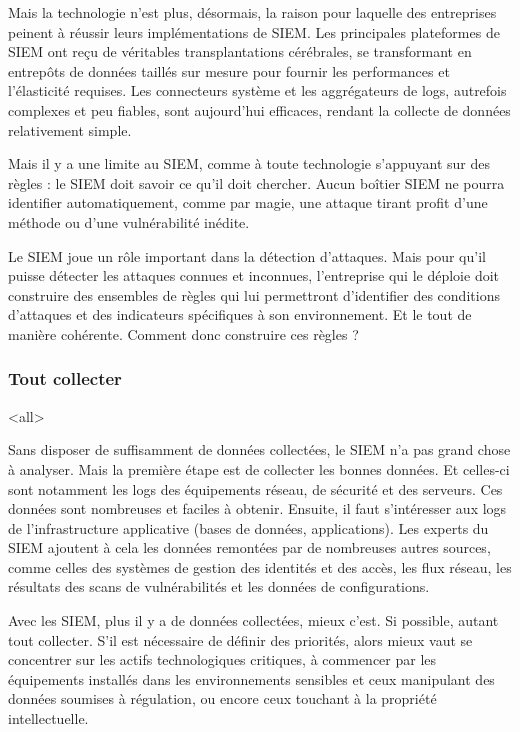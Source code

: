 Mais la technologie n’est plus, désormais, la raison pour laquelle des entreprises peinent à réussir leurs implémentations de SIEM. Les principales plateformes de SIEM ont reçu de véritables transplantations cérébrales, se transformant en entrepôts de données taillés sur mesure pour fournir les performances et l’élasticité requises. Les connecteurs système et les aggrégateurs de logs, autrefois complexes et peu fiables, sont aujourd’hui efficaces, rendant la collecte de données relativement simple.

Mais il y a une limite au SIEM, comme à toute technologie s’appuyant sur des règles : le SIEM doit savoir ce qu’il doit chercher. Aucun boîtier SIEM ne pourra identifier automatiquement, comme par magie, une attaque tirant profit d’une méthode ou d’une vulnérabilité inédite.

Le SIEM joue un rôle important dans la détection d’attaques. Mais pour qu’il puisse détecter les attaques connues et inconnues, l’entreprise qui le déploie doit construire des ensembles de règles qui lui permettront d’identifier des conditions d’attaques et des indicateurs spécifiques à son environnement. Et le tout de manière cohérente. Comment donc construire ces règles ?


\subsubsection{Tout collecter}



\mode<all>{}



Sans disposer de suffisamment de données collectées, le SIEM n’a pas grand chose à analyser. Mais la première étape est de collecter les bonnes données. Et celles-ci sont notamment les logs des équipements réseau, de sécurité  et des serveurs. Ces données sont nombreuses et faciles à obtenir. Ensuite, il faut s’intéresser aux logs de l’infrastructure applicative (bases de données, applications). Les experts du SIEM ajoutent à cela les données remontées par de nombreuses autres sources, comme celles des systèmes de gestion des identités et des accès, les flux réseau, les résultats des scans de vulnérabilités et les données de configurations.

Avec les SIEM, plus il y a de données collectées, mieux c’est. Si possible, autant tout collecter. S’il est nécessaire de définir des priorités, alors mieux vaut se concentrer sur les actifs technologiques critiques, à commencer par les équipements installés dans les environnements sensibles et ceux manipulant des données soumises à régulation, ou encore ceux touchant à la propriété intellectuelle.


